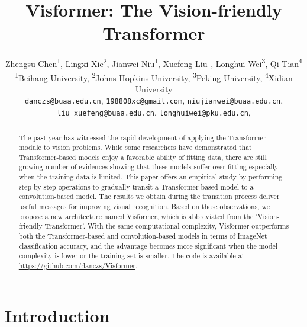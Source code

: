 \documentclass[10pt,twocolumn,letterpaper]{article}
\begin{document}
\title{Visformer: The Vision-friendly Transformer}

\author{Zhengsu Chen\textsuperscript{1}, Lingxi Xie\textsuperscript{2}, Jianwei Niu\textsuperscript{1}, Xuefeng Liu\textsuperscript{1}, Longhui Wei\textsuperscript{3}, Qi Tian\textsuperscript{4}\\
\textsuperscript{1}Beihang University, \textsuperscript{2}Johns Hopkins University, \textsuperscript{3}Peking University, \textsuperscript{4}Xidian University\\
{\tt\small danczs@buaa.edu.cn}, {\tt\small 198808xc@gmail.com}, {\tt\small niujianwei@buaa.edu.cn},\\
{\tt\small liu\_xuefeng@buaa.edu.cn}, {\tt\small longhuiwei@pku.edu.cn}, {\tt\small  }
}





\maketitle
\ificcvfinal\thispagestyle{empty}\fi

\begin{abstract}


The past year has witnessed the rapid development of applying the Transformer module to vision problems. While some researchers have demonstrated that Transformer-based models enjoy a favorable ability of fitting data, there are still growing number of evidences showing that these models suffer over-fitting especially when the training data is limited. This paper offers an empirical study by performing step-by-step operations to gradually transit a Transformer-based model to a convolution-based model. The results we obtain during the transition process deliver useful messages for improving visual recognition. Based on these observations, we propose a new architecture named Visformer, which is abbreviated from the `Vision-friendly Transformer'. With the same computational complexity, Visformer outperforms both the Transformer-based and convolution-based models in terms of ImageNet classification accuracy, and the advantage becomes more significant when the model complexity is lower or the training set is smaller. The code is available at \url{https://github.com/danczs/Visformer}.
\end{abstract}

\section{Introduction}
\end{document}
